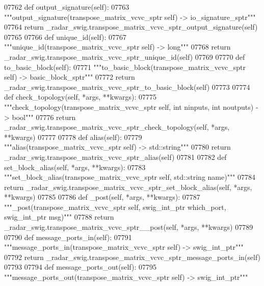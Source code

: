 \begin{DoxyCode}
{{{{{{{{{{{{{{{{{{{{{{{{{07762     \textcolor{keyword}{def }output_signature(self):
07763         \textcolor{stringliteral}{"""output\_signature(transpose\_matrix\_vcvc\_sptr self) -> io\_signature\_sptr"""}
07764         \textcolor{keywordflow}{return} \_radar\_swig.transpose\_matrix\_vcvc\_sptr\_output\_signature(self)
07765 
07766     \textcolor{keyword}{def }unique_id(self):
07767         \textcolor{stringliteral}{"""unique\_id(transpose\_matrix\_vcvc\_sptr self) -> long"""}
07768         \textcolor{keywordflow}{return} \_radar\_swig.transpose\_matrix\_vcvc\_sptr\_unique\_id(self)
07769 
07770     \textcolor{keyword}{def }to_basic_block(self):
07771         \textcolor{stringliteral}{"""to\_basic\_block(transpose\_matrix\_vcvc\_sptr self) -> basic\_block\_sptr"""}
07772         \textcolor{keywordflow}{return} \_radar\_swig.transpose\_matrix\_vcvc\_sptr\_to\_basic\_block(self)
07773 
07774     \textcolor{keyword}{def }check_topology(self, *args, **kwargs):
07775         \textcolor{stringliteral}{"""check\_topology(transpose\_matrix\_vcvc\_sptr self, int ninputs, int noutputs) -> bool"""}
07776         \textcolor{keywordflow}{return} \_radar\_swig.transpose\_matrix\_vcvc\_sptr\_check\_topology(self, *args, **kwargs)
07777 
07778     \textcolor{keyword}{def }alias(self):
07779         \textcolor{stringliteral}{"""alias(transpose\_matrix\_vcvc\_sptr self) -> std::string"""}
07780         \textcolor{keywordflow}{return} \_radar\_swig.transpose\_matrix\_vcvc\_sptr\_alias(self)
07781 
07782     \textcolor{keyword}{def }set_block_alias(self, *args, **kwargs):
07783         \textcolor{stringliteral}{"""set\_block\_alias(transpose\_matrix\_vcvc\_sptr self, std::string name)"""}
07784         \textcolor{keywordflow}{return} \_radar\_swig.transpose\_matrix\_vcvc\_sptr\_set\_block\_alias(self, *args, **kwargs)
07785 
07786     \textcolor{keyword}{def }_post(self, *args, **kwargs):
07787         \textcolor{stringliteral}{"""\_post(transpose\_matrix\_vcvc\_sptr self, swig\_int\_ptr which\_port, swig\_int\_ptr msg)"""}
07788         \textcolor{keywordflow}{return} \_radar\_swig.transpose\_matrix\_vcvc\_sptr\_\_post(self, *args, **kwargs)
07789 
07790     \textcolor{keyword}{def }message_ports_in(self):
07791         \textcolor{stringliteral}{"""message\_ports\_in(transpose\_matrix\_vcvc\_sptr self) -> swig\_int\_ptr"""}
07792         \textcolor{keywordflow}{return} \_radar\_swig.transpose\_matrix\_vcvc\_sptr\_message\_ports\_in(self)
07793 
07794     \textcolor{keyword}{def }message_ports_out(self):
07795         \textcolor{stringliteral}{"""message\_ports\_out(transpose\_matrix\_vcvc\_sptr self) -> swig\_int\_ptr"""}
}}}}}}}}}}}}}}}}}}}}}}}}}
\end{DoxyCode}
